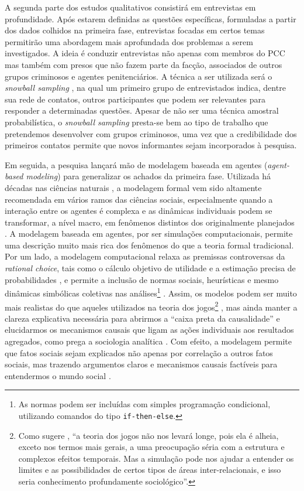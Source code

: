 \documentclass[a4paper,11pt]{article}
\begin{document}
A segunda parte dos estudos qualitativos consistirá em entrevistas em profundidade. Após estarem definidas as questões específicas, formuladas a partir dos dados colhidos na primeira fase, entrevistas focadas em certos temas permitirão uma abordagem mais aprofundada dos problemas a serem investigados. A ideia é conduzir entrevistas não apenas com membros do PCC mas também com presos que não fazem parte da facção, associados de outros grupos criminosos e agentes penitenciários. A técnica a ser utilizada será o \textit{snowball sampling} \citep{goodman1961snowball}, na qual um primeiro grupo de entrevistados indica, dentre sua rede de contatos, outros participantes que podem ser relevantes para responder a determinadas questões. Apesar de não ser uma técnica amostral probabilística, o \textit{snowball sampling} presta-se bem ao tipo de trabalho que pretendemos desenvolver com grupos criminosos, uma vez que a credibilidade dos primeiros contatos permite que novos informantes sejam incorporados à pesquisa.

Em seguida, a pesquisa lançará mão de modelagem baseada em agentes (\textit{agent-based modeling}) para generalizar os achados da primeira fase. Utilizada há décadas nas ciências naturais \citep{zeigler2000theory}, a modelagem formal vem sido altamente recomendada em vários ramos das ciências sociais, especialmente quando a interação entre os agentes é complexa e as dinâmicas individuais podem se transformar, a nível macro, em fenômenos distintos dos originalmente planejados \citep{hedstrom2005dissecting, mccarty2007political, ordeshook1986game}. A modelagem baseada em agentes, por ser  simulações computacionais, permite uma descrição muito mais rica dos fenômenos do que a teoria formal tradicional. Por um lado, a modelagem computacional relaxa as premissas controversas da \textit{rational choice}, tais como o cálculo objetivo de utilidade e a estimação precisa de probabilidades \citep{bonabeau2002agent}, e permite a inclusão de normas sociais, heurísticas e mesmo dinâmicas simbólicas coletivas nas análises\footnote{As normas podem ser incluídas com simples programação condicional, utilizando comandos do tipo \texttt{if-then-else}.} \citep{gilbert2000build}. Assim, os modelos podem ser muito mais realistas do que aqueles utilizados na teoria dos jogos\footnote{Como sugere \citet[124]{abbott2001time}, ``a teoria dos jogos não nos levará longe, pois ela é alheia, exceto nos termos mais gerais, a uma preocupação séria com a estrutura e complexos efeitos temporais. Mas a simulação pode nos ajudar a entender os limites e as possibilidades de certos tipos de áreas inter-relacionais, e isso seria conhecimento profundamente sociológico''.} \citep{axelrod1997complexity, epstein2006generative}, mas ainda manter a clareza explicativa necessária para abrirmos a ``caixa preta da causalidade'' e elucidarmos os mecanismos causais que ligam as ações individuais aos resultados agregados, como prega a sociologia analítica \citep[13]{demeulenaere2011analytical}. Com efeito, a modelagem permite que fatos sociais sejam explicados não apenas por correlação a outros fatos sociais, mas trazendo argumentos claros e mecanismos causais factíveis para entendermos o mundo social \citep{de2005computational}. 
\end{document}
